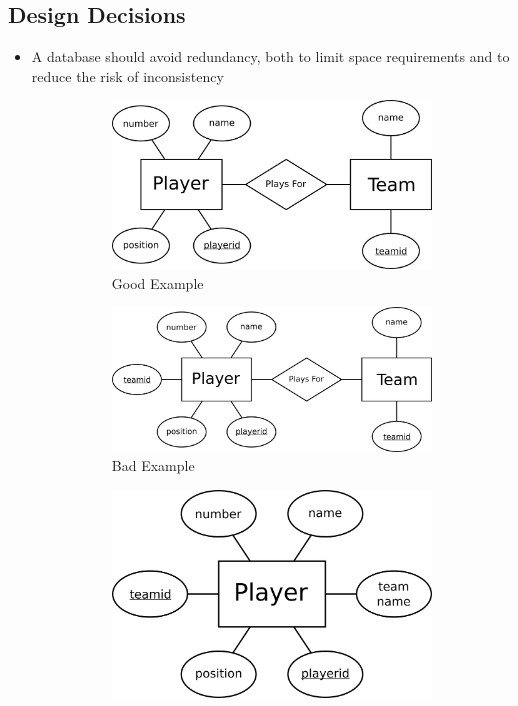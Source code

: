 \documentclass[a4paper]{article}
\begin{document}
\subsection{Design Decisions}
\begin{itemize}
\item A database should avoid redundancy, both to limit space requirements and to reduce the risk of inconsistency
\begin{figure}[H]
\centering
\begin{subfigure}{0.39\linewidth}
\centering
\includegraphics[width=0.9\linewidth]{entity16.png}
\caption*{Good Example}
\end{subfigure}
\begin{subfigure}{0.39\linewidth}
\centering
\includegraphics[width=0.9\linewidth]{entity17.png}
\caption*{Bad Example}
\end{subfigure}
\begin{subfigure}{0.19\linewidth}
\centering
\includegraphics[width=0.9\linewidth]{entity18.png}

\end{subfigure}
\end{figure}
\end{itemize}
\end{document}
